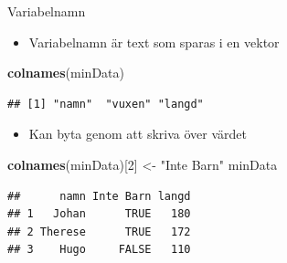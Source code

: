 \documentclass[
  11pt,
  ignorenonframetext,
]{beamer}
\newenvironment{Shaded}{\begin{snugshade}}{\end{snugshade}}
\newcommand{\DecValTok}[1]{\textcolor[rgb]{0.00,0.00,0.81}{#1}}
\newcommand{\FunctionTok}[1]{\textcolor[rgb]{0.13,0.29,0.53}{\textbf{#1}}}
\newcommand{\NormalTok}[1]{#1}
\newcommand{\OtherTok}[1]{\textcolor[rgb]{0.56,0.35,0.01}{#1}}
\newcommand{\StringTok}[1]{\textcolor[rgb]{0.31,0.60,0.02}{#1}}
\providecommand{\tightlist}{%
  \setlength{\itemsep}{0pt}\setlength{\parskip}{0pt}}
\begin{document}
\begin{frame}[fragile]{Variabelnamn}
\label{variabelnamn}
\begin{itemize}
\tightlist
\item
  Variabelnamn är text som sparas i en vektor
\end{itemize}

\begin{Shaded}
\begin{Highlighting}[]
\FunctionTok{colnames}\NormalTok{(minData)}
\end{Highlighting}
\end{Shaded}

\begin{verbatim}
## [1] "namn"  "vuxen" "langd"
\end{verbatim}

\pause

\begin{itemize}
\tightlist
\item
  Kan byta genom att skriva över värdet
\end{itemize}

\begin{Shaded}
\begin{Highlighting}[]
\FunctionTok{colnames}\NormalTok{(minData)[}\DecValTok{2}\NormalTok{] }\OtherTok{\textless{}{-}} \StringTok{"Inte Barn"}
\NormalTok{minData}
\end{Highlighting}
\end{Shaded}

\begin{verbatim}
##      namn Inte Barn langd
## 1   Johan      TRUE   180
## 2 Therese      TRUE   172
## 3    Hugo     FALSE   110
\end{verbatim}
\end{frame}
\end{document}
